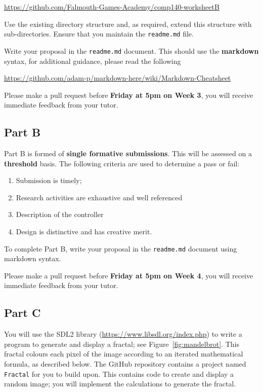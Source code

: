 \documentclass{../../../fal_assignment}
\begin{document}
\indent \url{https://github.com/Falmouth-Games-Academy/comp140-worksheetB}

Use the existing directory structure and, as required, extend this structure with sub-directories. Ensure that you maintain the \texttt{readme.md} file.

Write your proposal in the \texttt{readme.md} document. This should use the \textbf{markdown} syntax, for additional guidance, please read the following  

\indent \url{https://github.com/adam-p/markdown-here/wiki/Markdown-Cheatsheet}

Please make a pull request before \textbf{Friday at 5pm on Week 3}, you will receive immediate feedback from your tutor. 

\subsection*{Part B}

Part B is formed of \textbf{single formative submissions}. This will be assessed on a \textbf{threshold} basis. The following criteria are used to determine a pass or fail:

\begin{enumerate}[label=(\alph*)]
	\item Submission is timely;
	\item Research activities are exhaustive and well referenced
	\item Description of the controller 
	\item Design is distinctive and has creative merit.
\end{enumerate}

To complete Part B, write your proposal in the \texttt{readme.md} document using markdown syntax.

Please make a pull request before \textbf{Friday at 5pm on Week 4}, you will receive immediate feedback from your tutor. 

\subsection*{Part C}

You will use the SDL2 library (\url{https://www.libsdl.org/index.php}) to write a program to generate and display a fractal; see Figure~\ref{fig:mandelbrot}.
This fractal colours each pixel of the image according to an iterated mathematical formula, as described below.
The GitHub repository contains a project named \texttt{Fractal} for you to build upon.
This contains code to create and display a random image; you will implement the calculations to generate the fractal.
\end{document}
